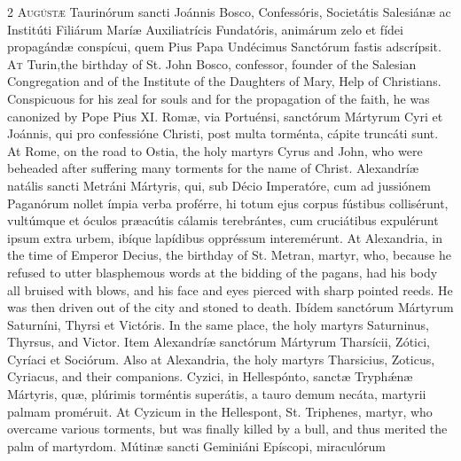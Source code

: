 \begin{paracol}{2}
\lettrine[lines=2]{A}{ugústæ} Taurinórum sancti Joánnis Bosco, 
 Confessóris, Societátis Salesiánæ ac Institúti Filiárum Maríæ Auxiliatrícis 
 Fundatóris, animárum zelo et fídei propagándæ conspícui, quem Pius Papa 
 Undécimus Sanctórum fastis adscrípsit.
\switchcolumn
{}
\lettrine[lines=2]{A}{t} Turin,the birthday of St. John Bosco, confessor, founder of the Salesian 
 Congregation and of the Institute of the Daughters of Mary, Help of 
 Christians. Conspicuous for his zeal for souls and for the propagation 
 of the faith, he was canonized by Pope Pius XI.
\switchcolumn*
{}
Romæ, via Portuénsi, sanctórum Mártyrum Cyri et 
 Joánnis, qui pro confessióne Christi, post multa torménta, cápite truncáti 
 sunt.
\switchcolumn
{}
At Rome, on the road to Ostia, the holy martyrs Cyrus and John, who were 
 beheaded after suffering many torments for the name of Christ.
\switchcolumn*
{}
Alexandríæ natális sancti Metráni Mártyris, 
 qui, sub Décio Imperatóre, cum ad jussiónem Paganórum nollet ímpia verba 
 proférre, hi totum ejus corpus fústibus collisérunt, vultúmque et óculos 
 præacútis cálamis terebrántes, cum cruciátibus expulérunt ipsum extra urbem, 
 ibíque lapídibus oppréssum interemérunt.
\switchcolumn
{}
At Alexandria, in the time of Emperor Decius, the birthday of St. Metran, 
 martyr, who, because he refused to utter blasphemous words at the bidding of 
 the pagans, had his body all bruised with blows, and his face and eyes 
 pierced with sharp pointed reeds. He was then driven out of the city 
 and stoned to death.
\switchcolumn*
{}
Ibídem sanctórum Mártyrum Saturníni, Thyrsi et Victóris.
\switchcolumn
{}
In the same place, the holy martyrs Saturninus, Thyrsus, and Victor.
\switchcolumn*
{}
Item Alexandríæ sanctórum Mártyrum Tharsícii, 
 Zótici, Cyríaci et Sociórum.
\switchcolumn
{}
Also at Alexandria, the holy martyrs Tharsicius, Zoticus, Cyriacus, and 
 their companions.
\switchcolumn*
{}
Cyzici, in Hellespónto, sanctæ Tryphǽnæ 
 Mártyris, quæ, plúrimis torméntis superátis, a tauro demum necáta, martyrii 
 palmam proméruit.
\switchcolumn
{}
At Cyzicum in the Hellespont, St. Triphenes, martyr, who overcame various 
 torments, but was finally killed by a bull, and thus merited the palm of 
 martyrdom.
\switchcolumn*
{}
Mútinæ sancti Geminiáni Epíscopi, miraculórum 

\end{paracol}

